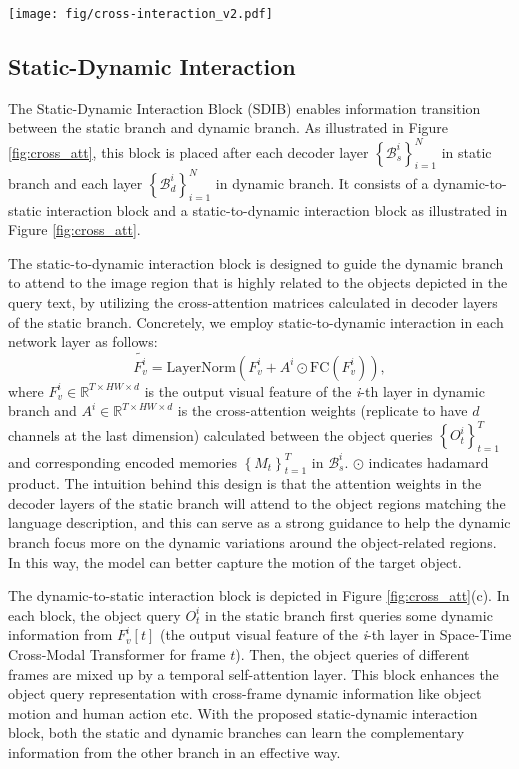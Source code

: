 \documentclass[sigconf]{acmart}
\begin{document}
\begin{figure*}[t]
  \centering
  \texttt{[image: fig/cross-interaction\_v2.pdf]}
  \caption{The architectures of the proposed Static-Dynamic Interaction Block.}
    \label{fig:cross_att}
\end{figure*}

\subsection{Static-Dynamic Interaction}
The Static-Dynamic Interaction Block (SDIB) enables information transition between the static branch and dynamic branch. As illustrated in Figure \ref{fig:cross_att}, this block is placed after each decoder layer $\left\{\mathcal{B}_s^{i}\right\}_{i=1}^{N}$ in static branch and each layer $\left\{\mathcal{B}_d^{i}\right\}_{i=1}^{N}$ in dynamic branch. It consists of a dynamic-to-static interaction block and a static-to-dynamic interaction block as illustrated in Figure \ref{fig:cross_att}. 

The static-to-dynamic interaction block is designed to guide the dynamic branch to attend to the image region that is highly related to the objects depicted in the query text, by utilizing the cross-attention matrices calculated in decoder layers of the static branch. Concretely, we employ static-to-dynamic interaction in each network layer as follows:
\begin{equation}
\widetilde{F^i_v} = \text{LayerNorm}(F^i_v + A^i \odot \text{FC}(F^i_v)),
\end{equation}
where $F^i_v \in \mathbb{R}^{T\times HW \times d}$ is the output visual feature of the \emph{i}-th layer in dynamic branch and $A^{i} \in \mathbb{R}^{T\times HW \times d}$ is the cross-attention weights (replicate to have $d$ channels at the last dimension) calculated between the object queries $\left\{O^i_t\right\}_{t=1}^{T}$ and corresponding encoded memories $\left\{M_t\right\}_{t=1}^{T}$ in $\mathcal{B}_s^{i}$. $\odot$ indicates hadamard product. The intuition behind this design is that the attention weights in the decoder layers of the static branch will attend to the object regions matching the language description, and this can serve as a strong guidance to help the dynamic branch focus more on the dynamic variations around the object-related regions. In this way, the model can better capture the motion of the target object. 

The dynamic-to-static interaction block is depicted in Figure \ref{fig:cross_att}(c). In each block, the object query $O^i_t$ in the static branch first queries some dynamic information from $F_v^i[t]$ (the output visual feature of the \emph{i}-th layer in Space-Time Cross-Modal Transformer for frame $t$). Then, the object queries of different frames are mixed up by a temporal self-attention layer. This block enhances the object query representation with cross-frame dynamic information like object motion and human action etc. With the proposed static-dynamic interaction block, both the static and dynamic branches can learn the complementary information from the other branch in an effective way.
\end{document}
